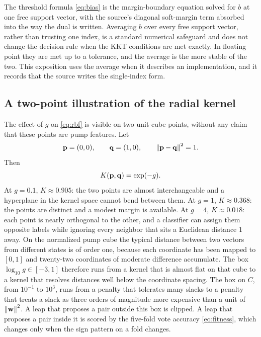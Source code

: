 The threshold formula \eqref{eq:bias} is the margin-boundary equation solved for \(b\) at one free support vector, with the source's diagonal soft-margin term absorbed into the way the dual is written.
Averaging \(b\) over every free support vector, rather than trusting one index, is a standard numerical safeguard and does not change the decision rule when the KKT conditions are met exactly.
In floating point they are met up to a tolerance, and the average is the more stable of the two.
This exposition uses the average when it describes an implementation, and it records that the source writes the single-index form.

\subsection{A two-point illustration of the radial kernel}
\label{sec:rbftoy}

The effect of \(g\) on \eqref{eq:rbf} is visible on two unit-cube points, without any claim that these points are pump features.
Let
\begin{equation}
\mathbf{p}=(0,0),\qquad \mathbf{q}=(1,0),
\qquad
\left\lVert \mathbf{p}-\mathbf{q} \right\rVert^{2}=1.
\label{eq:pq}
\end{equation}
Then
\begin{equation}
K(\mathbf{p}, \mathbf{q})=\exp(-g).
\label{eq:kpq}
\end{equation}
At \(g=0.1\), \(K\approx 0.905\): the two points are almost interchangeable and a hyperplane in the kernel space cannot bend between them.
At \(g=1\), \(K\approx 0.368\): the points are distinct and a modest margin is available.
At \(g=4\), \(K\approx 0.018\): each point is nearly orthogonal to the other, and a classifier can assign them opposite labels while ignoring every neighbor that sits a Euclidean distance \(1\) away.
On the normalized pump cube the typical distance between two vectors from different states is of order one, because each coordinate has been mapped to \([0,1]\) and twenty-two coordinates of moderate difference accumulate.
The box \(\log_{10} g\in[-3,1]\) therefore runs from a kernel that is almost flat on that cube to a kernel that resolves distances well below the coordinate spacing.
The box on \(C\), from \(10^{-1}\) to \(10^{3}\), runs from a penalty that tolerates many slacks to a penalty that treats a slack as three orders of magnitude more expensive than a unit of \(\left\lVert \mathbf{w} \right\rVert^{2}\).
A leap that proposes a pair outside this box is clipped.
A leap that proposes a pair inside it is scored by the five-fold vote accuracy \eqref{eq:fitness}, which changes only when the sign pattern on a fold changes.

